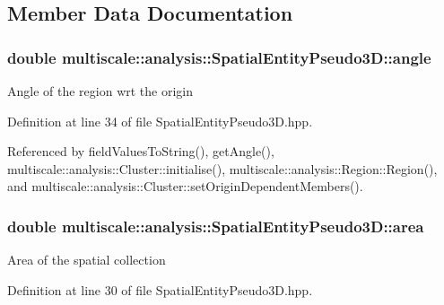 \subsection{\-Member \-Data \-Documentation}
\hypertarget{classmultiscale_1_1analysis_1_1SpatialEntityPseudo3D_aa077aab864e659f93522863cc10824bb}{
\subsubsection[{angle}]{\setlength{\rightskip}{0pt plus 5cm}double {\bf multiscale\-::analysis\-::\-Spatial\-Entity\-Pseudo3\-D\-::angle}}}\label{classmultiscale_1_1analysis_1_1SpatialEntityPseudo3D_aa077aab864e659f93522863cc10824bb}
\-Angle of the region wrt the origin 

\-Definition at line 34 of file \-Spatial\-Entity\-Pseudo3\-D.\-hpp.



\-Referenced by field\-Values\-To\-String(), get\-Angle(), multiscale\-::analysis\-::\-Cluster\-::initialise(), multiscale\-::analysis\-::\-Region\-::\-Region(), and multiscale\-::analysis\-::\-Cluster\-::set\-Origin\-Dependent\-Members().

\hypertarget{classmultiscale_1_1analysis_1_1SpatialEntityPseudo3D_a1621d5b3ece663bf4c5501940e860292}{
\subsubsection[{area}]{\setlength{\rightskip}{0pt plus 5cm}double {\bf multiscale\-::analysis\-::\-Spatial\-Entity\-Pseudo3\-D\-::area}}}\label{classmultiscale_1_1analysis_1_1SpatialEntityPseudo3D_a1621d5b3ece663bf4c5501940e860292}
\-Area of the spatial collection 

\-Definition at line 30 of file \-Spatial\-Entity\-Pseudo3\-D.\-hpp.



